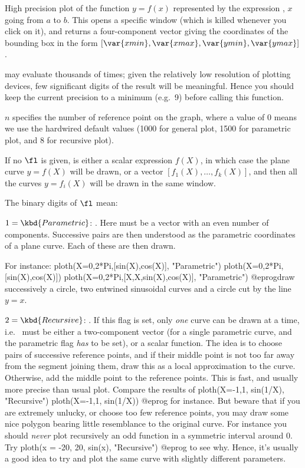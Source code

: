 \label{se:ploth}
High precision plot of the function $y=f(x)$ represented by the expression
, $x$ going from $a$ to $b$. This opens a specific window (which is
killed whenever you click on it), and returns a four-component vector giving
the coordinates of the bounding box in the form
$[\var{xmin},\var{xmax},\var{ymin},\var{ymax}]$.

  may evaluate  thousands of
times; given the relatively low resolution of plotting devices, few
significant digits of the result will be meaningful. Hence you should keep
the current precision to a minimum (e.g.~9) before calling this function.

$n$ specifies the number of reference point on the graph, where a value of 0
means we use the hardwired default values (1000 for general plot, 1500 for
parametric plot, and 8 for recursive plot).

If no $\fl$ is given,  is either a scalar expression $f(X)$, in which
case the plane curve $y=f(X)$ will be drawn, or a vector
$[f_1(X),\dots,f_k(X)]$, and then all the curves $y=f_i(X)$ will be drawn in
the same window.

\noindent The binary digits of $\fl$ mean:

\item $1 = \kbd{Parametric}$: . Here  must
be a vector with an even number of components. Successive pairs are then
understood as the parametric coordinates of a plane curve. Each of these are
then drawn.

For instance:
\bprog
ploth(X=0,2*Pi,[sin(X),cos(X)], "Parametric")
ploth(X=0,2*Pi,[sin(X),cos(X)])
ploth(X=0,2*Pi,[X,X,sin(X),cos(X)], "Parametric")
@eprog\noindent draw successively a circle, two entwined sinusoidal curves
and a circle cut by the line $y=x$.

\item $2 = \kbd{Recursive}$: . If this flag is set,
only \emph{one} curve can be drawn at a time, i.e.~ must be either a
two-component vector (for a single parametric curve, and the parametric flag
\emph{has} to be set), or a scalar function. The idea is to choose pairs of
successive reference points, and if their middle point is not too far away
from the segment joining them, draw this as a local approximation to the
curve. Otherwise, add the middle point to the reference points. This is
fast, and usually more precise than usual plot. Compare the results of
\bprog
ploth(X=-1,1, sin(1/X), "Recursive")
ploth(X=-1,1, sin(1/X))
@eprog\noindent
for instance. But beware that if you are extremely unlucky, or choose too few
reference points, you may draw some nice polygon bearing little resemblance
to the original curve. For instance you should \emph{never} plot recursively
an odd function in a symmetric interval around 0. Try
\bprog
ploth(x = -20, 20, sin(x), "Recursive")
@eprog\noindent
to see why. Hence, it's usually a good idea to try and plot the same curve
with slightly different parameters.

